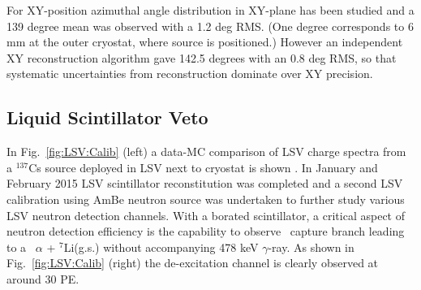For XY-position azimuthal angle distribution in XY-plane has been studied and a 139 degree mean was observed with a 1.2 deg RMS. (One degree corresponds to 6 mm at the outer cryostat, where source is positioned.) However an independent XY reconstruction algorithm gave 142.5 degrees with an 0.8 deg RMS, so that systematic uncertainties from reconstruction dominate over XY precision. %



\subsection{Liquid Scintillator Veto}\label{sec:LSV:gammasources}

In Fig.~\ref{fig:LSV:Calib} (left) a data-MC comparison of LSV charge spectra from a $^{137}$Cs source deployed in LSV next to cryostat is shown \cite{DS50:G4DS:paper}.
In January and February 2015 LSV scintillator reconstitution was completed and a second LSV calibration using AmBe neutron source was undertaken to further study various LSV neutron detection channels. With a borated scintillator, a critical aspect of neutron detection efficiency is the capability to observe \brbortenground\ capture branch leading to a \enbortengroundalpha\ $\alpha$ + $^7$Li(g.s.) without accompanying 478 keV $\gamma$-ray. As shown in Fig.~\ref{fig:LSV:Calib} (right) the de-excitation channel is clearly observed at around 30 PE.

